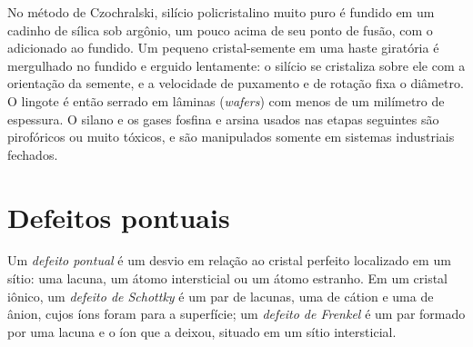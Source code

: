 \begin{inthelab}
No método de Czochralski, silício policristalino muito puro é fundido em um
cadinho de sílica sob argônio, um pouco acima de seu ponto de fusão, com o
 adicionado ao fundido. Um pequeno cristal-semente em uma haste giratória é mergulhado no
fundido e erguido lentamente: o silício se cristaliza sobre ele com a
orientação da semente, e a velocidade de puxamento e de rotação fixa o diâmetro. O lingote
é então serrado em lâminas (\textit{wafers}) com menos de um milímetro de espessura. O silano e os gases
 fosfina e arsina usados nas etapas seguintes são pirofóricos ou muito tóxicos,
e são manipulados somente em sistemas industriais fechados.
\end{inthelab}

\section{Defeitos pontuais}

\begin{definition}\label{def:b3:solid-state:defects}
Um \emph{defeito pontual} é um desvio em relação ao cristal
perfeito localizado em um sítio: uma lacuna, um átomo intersticial ou um átomo
estranho. Em um cristal iônico, um \emph{defeito de Schottky} é um
par de lacunas, uma de cátion e uma de ânion, cujos íons foram para a
superfície; um \emph{defeito de Frenkel} é um par formado por uma
lacuna e o íon que a deixou, situado em um sítio intersticial.
\end{definition}

